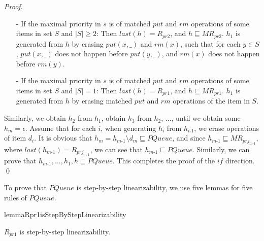 \documentclass{llncs}
\begin{document}
\begin {proof}
\begin{itemize}
\item[-] If the maximal priority in $s$ is of matched $\textit{put}$ and $\textit{rm}$ operations of some items in set $S$ and $\vert S \vert \geq 2$: Then $\textit{last}(h) = R_{\textit{pr2}}$, and $h \sqsubseteq \textit{MR}_{\textit{pr2}}$. $h_1$ is generated from $h$ by erasing $\textit{put}(x,\_)$ and $\textit{rm}(x)$, such that for each $y \in S$, $\textit{put}(x,\_)$ does not happen before $\textit{put}(y,\_)$, and $\textit{rm}(x)$ does not happen before $\textit{rm}(y)$.

\item[-] If the maximal priority in $s$ is of matched $\textit{put}$ and $\textit{rm}$ operations of some items in set $S$ and $\vert S \vert = 1$: Then $\textit{last}(h) = R_{\textit{pr1}}$, and $h \sqsubseteq \textit{MR}_{\textit{pr1}}$. $h_1$ is generated from $h$ by erasing matched $\textit{put}$ and $\textit{rm}$ operations of the item in $S$.
\end{itemize}

Similarly, we obtain $h_2$ from $h_1$, obtain $h_3$ from $h_2$, $\ldots$, until we obtain some $h_m = \epsilon$. Assume that for each $i$, when generating $h_i$ from $h_{\textit{i-1}}$, we erase operations of item $d_i$. It is obvious that $h_m = h_{\textit{m-1}} \setminus d_m \sqsubseteq \textit{PQueue}$, and since $h_{\textit{m-1}} \sqsubseteq \textit{MR}_{\textit{prj}_{\textit{m-1}}}$, where $\textit{last}(h_{\textit{m-1}}) = R_{\textit{prj}_{\textit{m-1}}}$, we can see that $h_{\textit{m-1}} \sqsubseteq \textit{PQueue}$. Similarly, we can prove that $h_{\textit{m-1}},\ldots,h_1,h \sqsubseteq \textit{PQueue}$. This completes the proof of the $\textit{if}$ direction. \qed
\end {proof}


To prove that $\textit{PQueue}$ is step-by-step linearizability, we use five lemmas for five rules of $\textit{PQueue}$.


\begin{restatable}{lemma}{Rpr1isStepByStepLinearizability}
\label{lemma:Rpr1 is step-by-step linearizability}

$R_{\textit{pr1}}$ is step-by-step linearizability.

\end{restatable}
\end{document}
